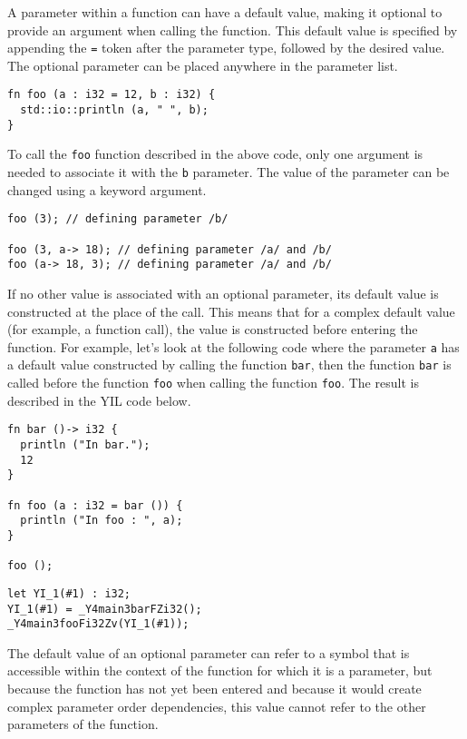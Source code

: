 A parameter within a function can have a default value, making it optional to
provide an argument when calling the function. This default value is specified
by appending the \texttt{=} token after the parameter type, followed by the
desired value. The optional parameter can be placed anywhere in the parameter
list.

\begin{lstlisting}[style=coloredverbatim]
fn foo (a : i32 = 12, b : i32) {
  std::io::println (a, " ", b);
}
\end{lstlisting}

To call the \texttt{foo} function described in the above code, only one argument
is needed to associate it with the \texttt{b} parameter. The value of the
parameter can be changed using a keyword argument.

\begin{lstlisting}[style=coloredverbatim]
foo (3); // defining parameter /b/

foo (3, a-> 18); // defining parameter /a/ and /b/
foo (a-> 18, 3); // defining parameter /a/ and /b/
\end{lstlisting}

If no other value is associated with an optional parameter, its default value is
constructed at the place of the call. This means that for a complex default
value (for example, a function call), the value is constructed before entering
the function. For example, let's look at the following code where the parameter
\texttt{a} has a default value constructed by calling the function \texttt{bar},
then the function \texttt{bar} is called before the function \texttt{foo} when
calling the function \texttt{foo}. The result is described in the YIL code
below.

\begin{lstlisting}[style=coloredverbatim]
fn bar ()-> i32 {
  println ("In bar.");
  12
}

fn foo (a : i32 = bar ()) {
  println ("In foo : ", a);
}

foo ();
\end{lstlisting}

\begin{lstlisting}[style=intermediateVerb]
let YI_1(#1) : i32;
YI_1(#1) = _Y4main3barFZi32();
_Y4main3fooFi32Zv(YI_1(#1));
\end{lstlisting}

The default value of an optional parameter can refer to a symbol that is
accessible within the context of the function for which it is a parameter, but
because the function has not yet been entered and because it would create
complex parameter order dependencies, this value cannot refer to the other
parameters of the function.

